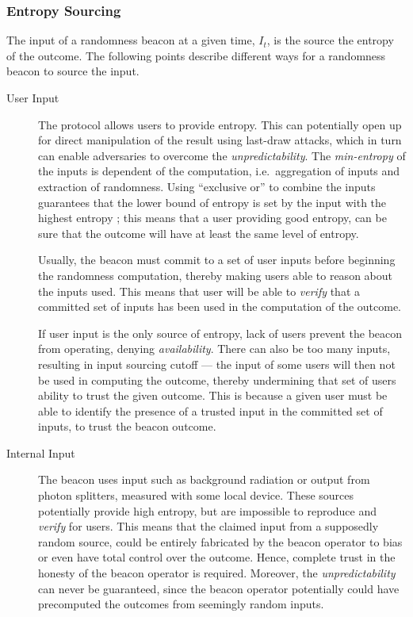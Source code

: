 \subsubsection{Entropy Sourcing}
The input of a randomness beacon at a given time, $I_t$, is the source the entropy of the outcome.
The following points describe different ways for a randomness beacon to source the input.
\begin{description}
    \item[User Input]
        The protocol allows users to provide entropy.
        This can potentially open up for direct manipulation of the result using last-draw attacks, which in turn can enable adversaries to overcome the \emph{unpredictability}.
        The \emph{min-entropy} of the inputs is dependent of the computation, i.e.\ aggregation of inputs and extraction of randomness.
        Using \enquote{exclusive or} to combine the inputs guarantees that the lower bound of entropy is set by the input with the highest entropy ;
        this means that a user providing good entropy, can be sure that the outcome will have at least the same level of entropy.

        Usually, the beacon must commit to a set of user inputs before beginning the randomness computation, thereby making users able to reason about the inputs used.
        This means that user will be able to \emph{verify} that a committed set of inputs has been used in the computation of the outcome.

        If user input is the only source of entropy, lack of users prevent the beacon from operating, denying \emph{availability}.
        There can also be too many inputs, resulting in input sourcing cutoff ---
        the input of some users will then not be used in computing the outcome, thereby undermining that set of users ability to trust the given outcome.
        This is because a given user must be able to identify the presence of a trusted input in the committed set of inputs, to trust the beacon outcome.

    \item[Internal Input]
        The beacon uses input such as background radiation or output from photon splitters, measured with some local device.
        These sources potentially provide high entropy, but are impossible to reproduce and \emph{verify} for users.
        This means that the claimed input from a supposedly random source, could be entirely fabricated by the beacon operator to bias or even have total control over the outcome.
        Hence, complete trust in the honesty of the beacon operator is required.
        Moreover, the \emph{unpredictability} can never be guaranteed, since the beacon operator potentially could have precomputed the outcomes from seemingly random inputs.


\end{description}
